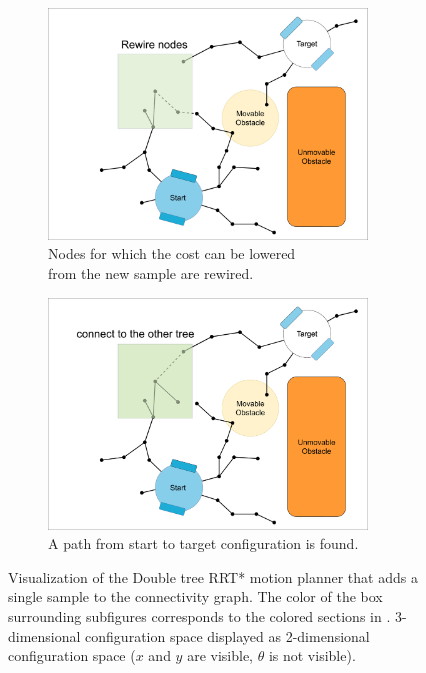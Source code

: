 \begin{figure}[H]
    \begin{subfigure}{.49\textwidth}
    \centering
    \includegraphics[width=0.93\textwidth, cfbox=my_green 5pt 0pt]{figures/mp/5mp_rewire.drawio.png}
    \caption{Nodes for which the cost can be lowered\\from the new sample are rewired.}%
    \label{subfig:mp_rewire}
    \end{subfigure}
    \begin{subfigure}{.49\textwidth}
    \centering
    \includegraphics[width=0.93\textwidth, cfbox=my_green 5pt 0pt]{figures/mp/6mp_search_other_tree.drawio.png}
    \caption{A path from start to target configuration is found. \bs}
    \end{subfigure}

    \caption{Visualization of the Double tree \acs{RRT*} motion planner that adds a single sample to the connectivity graph. The color of the box surrounding subfigures corresponds to the colored sections in . 3-dimensional configuration space displayed as 2-dimensional configuration space ($x$ and $y$ are visible, $\theta$ is not visible).}
    \label{fig:motion_planner_adding_one_sample}
\end{figure}

